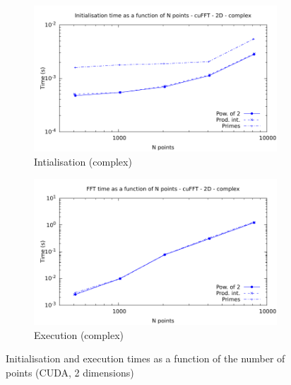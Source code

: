 \documentclass[12pt, a4paper]{article}
\begin{document}
\begin{figure}[H]
\begin{subfigure}{.5\textwidth}
\centering
\includegraphics[width=.9\linewidth]{graphs/fft-cuda-2d-pow2-c-init.pdf}
\caption{Intialisation (complex)}
\label{FFTCUDA2DCI}
\end{subfigure}%
\begin{subfigure}{.5\textwidth}
\centering
\includegraphics[width=.9\linewidth]{graphs/fft-cuda-2d-pow2-c-exec.pdf}
\caption{Execution (complex)}
\label{FFTCUDA2DCE}
\end{subfigure}
\caption{Initialisation and execution times as a function of the number of points (CUDA, 2 dimensions)}
\label{FFTCUDA2D}
\end{figure}
\end{document}

